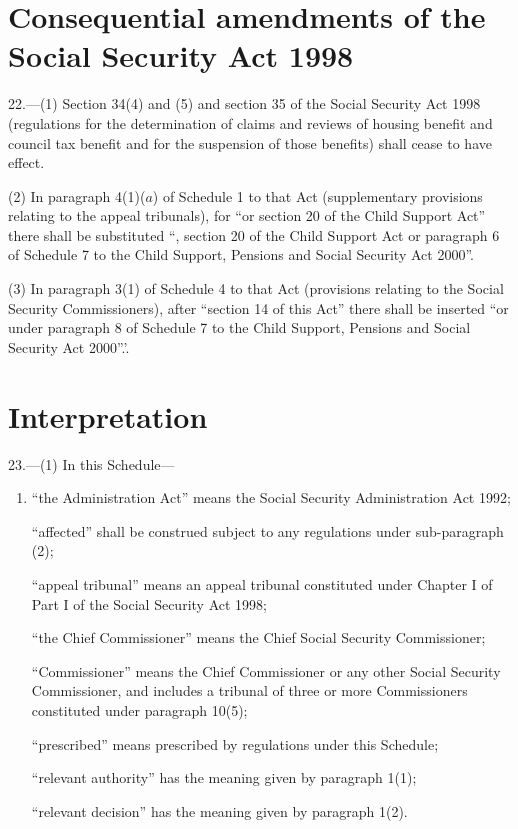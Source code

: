 \documentclass[12pt,a4paper]{article}
\begin{document}
\section*{Consequential amendments of the Social Security Act 1998}

22.---(1) Section 34(4)  and (5)  and section 35 of the Social Security Act 1998 (regulations for the determination of claims and reviews of housing benefit and council tax benefit and for the suspension of those benefits) shall cease to have effect.

(2) In paragraph 4(1)($a$)  of Schedule 1 to that Act (supplementary provisions relating to the appeal tribunals), for “or section 20 of the Child Support Act” there shall be substituted “, section 20 of the Child Support Act or paragraph 6 of Schedule 7 to the Child Support, Pensions and Social Security Act 2000”.

(3) In paragraph 3(1)  of Schedule 4 to that Act (provisions relating to the Social Security Commissioners), after “section 14 of this Act” there shall be inserted “or under paragraph 8 of Schedule 7 to the Child Support, Pensions and Social Security Act 2000”.'.


\section*{Interpretation}

23.---(1) In this Schedule—
\begin{enumerate}\item[]
    “the Administration Act” means the Social Security Administration Act 1992;

    “affected” shall be construed subject to any regulations under sub-\hspace{0pt}paragraph (2);

    “appeal tribunal” means an appeal tribunal constituted under Chapter I of Part I of the Social Security Act 1998;

    “the Chief Commissioner” means the Chief Social Security Commissioner;

    “Commissioner” means the Chief Commissioner or any other Social Security Commissioner, and includes a tribunal of three or more Commissioners constituted under paragraph 10(5);

    “prescribed” means prescribed by regulations under this Schedule;

    “relevant authority” has the meaning given by paragraph 1(1);

    “relevant decision” has the meaning given by paragraph 1(2). 
\end{enumerate}
\end{document}
